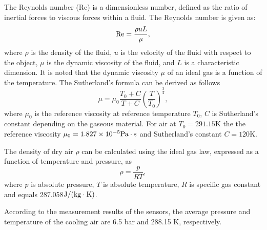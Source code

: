 \documentclass[preprint,5p,twocolumn,10pt,sort&compress]{elsarticle}
\begin{document}
The Reynolds number (Re) is a dimensionless number, defined as the ratio of inertial forces to viscous forces within a fluid.
The Reynolds number is given as:
\begin{equation}
{\rm{Re}} = \frac{{\rho uL}}{\mu },
\end{equation}
where
$\rho$ is the density of the fluid, $u$ is the velocity of the fluid with respect to the object, $\mu$ is the dynamic viscosity of the fluid, and $L$ is a characteristic dimension.
It is noted that the dynamic viscosity $\mu$ of an ideal gas is a function of the temperature. The Sutherland's formula can be derived as follows
\begin{equation}
\mu  = {\mu _0}\frac{{{T_0} + C}}{{T + C}}{\left( {\frac{T}{{{T_0}}}} \right)^{\frac{3}{2}}},
\end{equation}
where 
$\mu_0$ is the reference viscosity at reference temperature $T_0$,
$C$ is Sutherland's constant depending on the gaseous material. For air at $T_0=291.15 $K the the reference viscosity $\mu_0=1.827\times 10^{-5} \rm{Pa\cdot s}$ and Sutherland's constant $C=120$K.

The density of dry air $\rho$ can be calculated using the ideal gas law, expressed as a function of temperature and pressure, as 
\begin{equation}
\rho  = \frac{p}{{RT}},
\label{Equ:AirDensity}
\end{equation}
where
$p$ is absolute pressure,
$T$ is absolute temperature,
$R$ is specific gas constant and equals 287.058${\rm{J/(kg}} \cdot {\rm{K}})$.

According to the measurement results of the sensors, the average pressure and temperature of the cooling air are 6.5 bar and 288.15 K, respectively.
\end{document}

